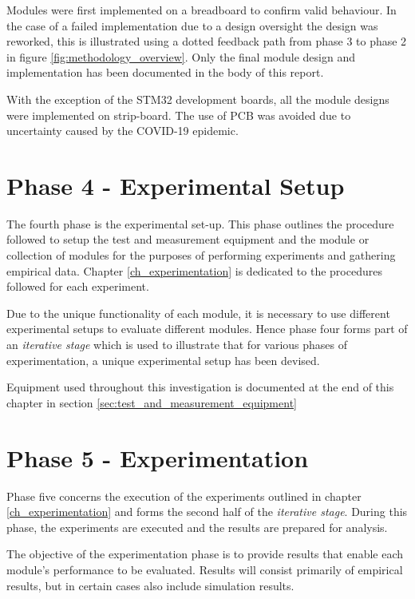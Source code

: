 Modules were first implemented on a breadboard to confirm valid behaviour. In the case of a failed implementation due to a design oversight the design was reworked, this is illustrated using a dotted feedback path from phase 3 to phase 2 in figure \ref{fig:methodology_overview}. Only the final module design and implementation has been documented in the body of this report.

With the exception of the STM32 development boards, all the module designs were implemented on strip-board. The use of PCB was avoided due to uncertainty caused by the COVID-19 epidemic.



\section{Phase 4 - Experimental Setup}

The fourth phase is the experimental set-up. This phase outlines the procedure followed to setup the test and measurement equipment and the module or collection of modules for the purposes of performing experiments and gathering empirical data. Chapter \ref{ch_experimentation} is dedicated to the procedures followed for each experiment.

Due to the unique functionality of each module, it is necessary to use different experimental setups to evaluate different modules. Hence phase four forms part of an \textit{iterative stage} which is used to illustrate that for various phases of experimentation, a unique experimental setup has been devised.

Equipment used throughout this investigation is documented at the end of this chapter in section \ref{sec:test_and_measurement_equipment}





\section{Phase 5 - Experimentation}

Phase five concerns the execution of the experiments outlined in chapter \ref{ch_experimentation} and forms the second half of the \textit{iterative stage}. During this phase, the experiments are executed and the results are prepared for analysis.

The objective of the experimentation phase is to provide results that enable each module's performance to be evaluated. Results will consist primarily of empirical results, but in certain cases also include simulation results.

